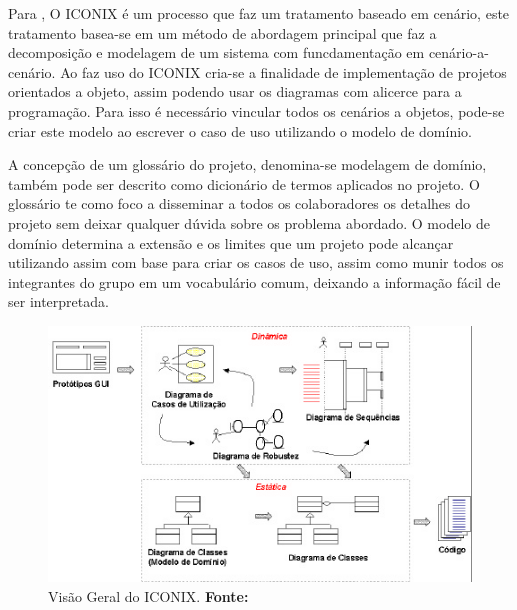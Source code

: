 \par Para , O ICONIX é um processo que faz um
tratamento baseado em cenário, este tratamento basea-se em um método de abordagem principal
que faz a decomposição e modelagem de um sistema com funcdamentação em
cenário-a-cenário. Ao faz uso do ICONIX cria-se a finalidade de implementação de
projetos orientados a objeto, assim podendo usar os diagramas com alicerce para
a programação. Para isso é necessário vincular todos os cenários a objetos,
pode-se criar este modelo ao escrever o caso de uso utilizando o modelo de
domínio.


\par A concepção de um glossário do projeto, denomina-se modelagem de domínio,
também pode ser descrito como dicionário de termos aplicados no projeto. O
glossário te como foco a disseminar a todos os colaboradores os detalhes do
projeto sem deixar qualquer dúvida sobre os problema abordado. O modelo de
domínio determina a extensão e os limites que um projeto pode alcançar
utilizando assim com base para criar os casos de uso, assim como munir todos os
integrantes do grupo em um vocabulário comum, deixando a informação fácil de ser
interpretada. 

\begin{figure}[h!]
  \centerline{\includegraphics[scale=1.2]{./imagens/iconix1.png}}
  \caption[Visão Geral do ICONIX]
          {Visão Geral do ICONIX. \textbf{Fonte:} \cite{UML_Silva_Videira}}
\label{fig:exemplo1}
\end{figure}

